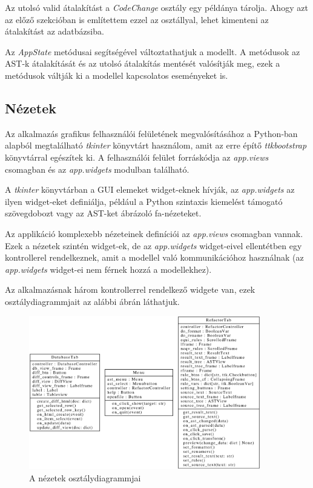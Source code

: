 Az utolsó valid átalakítást a \emph{CodeChange} osztály egy példánya tárolja.
Ahogy azt az előző szekcióban is említettem ezzel az osztállyal,
lehet kimenteni az átalakítást az adatbázsiba.

Az \emph{AppState} metódusai segítségével változtathatjuk a modellt.
A metódusok az AST-k átalakítását és az utolsó átalakítás mentését valósítják meg,
ezek a metódusok váltják ki a modellel kapcsolatos eseményeket is.

\subsection{Nézetek}

Az alkalmazás grafikus felhasználói felületének megvalósításához
a Python-ban alapból megtalálható
\emph{tkinter} könyvtárt használom, amit az erre építő \emph{ttkbootstrap} könyvtárral
egészítek ki.
A felhasználói felület forráskódja az \emph{app.views} csomagban és az \emph{app.widgets}
modulban található.

A \emph{tkinter} könyvtárban a GUI elemeket widget-eknek hívják,
az \emph{app.widgets} az ilyen widget-eket definiálja, például
a Python szintaxis kiemelést támogató szövegdobozt vagy az AST-ket ábrázoló
fa-nézeteket.

Az applikáció komplexebb nézeteinek definíciói az \emph{app.views} csomagban vannak.
Ezek a nézetek szintén widget-ek, de az \emph{app.widgets} widget-eivel ellentétben
egy kontrollerel rendelkeznek, amit a modellel való kommunikációhoz használnak
(az \emph{app.widgets} widget-ei nem férnek hozzá a modellekhez).

Az alkalmazásnak három kontrollerrel rendelkező widgete van,
ezek osztálydiagrammjait az alábbi ábrán láthatjuk.

\begin{figure}[H]
	\centering
	\includegraphics[width=0.9\textwidth]{images/uml/views.eps}
	\caption{\label{fig:views}A nézetek osztálydiagrammjai}
\end{figure}

